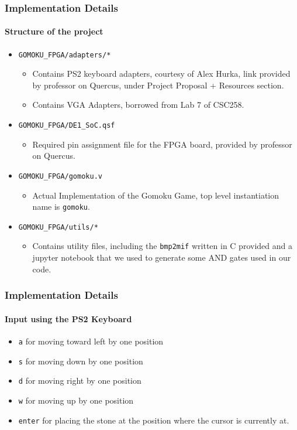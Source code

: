 \documentclass{beamer}
\begin{document}
\begin{frame}
    \frametitle{Implementation Details}
    \framesubtitle{Structure of the project}
    \begin{itemize}
        \item \texttt{GOMOKU\_FPGA/adapters/*}
        \begin{itemize}
            \item Contains PS2 keyboard adapters, courtesy of Alex Hurka, link provided by professor on Quercus, under Project Proposal + Resources section. 
            \item Contains VGA Adapters, borrowed from Lab 7 of CSC258.
        \end{itemize}
        \item \texttt{GOMOKU\_FPGA/DE1\_SoC.qsf}
        \begin{itemize}
            \item Required pin assignment file for the FPGA board, provided by professor on Quercus.
        \end{itemize}
        \item \texttt{GOMOKU\_FPGA/gomoku.v}
        \begin{itemize}
            \item Actual Implementation of the Gomoku Game, top level instantiation name is \texttt{gomoku}.
        \end{itemize}
        \item \texttt{GOMOKU\_FPGA/utils/*}
        \begin{itemize}
            \item Contains utility files, including the \texttt{bmp2mif} written in C provided and a jupyter notebook that we used to generate some AND gates used in our code. 
        \end{itemize}
    \end{itemize}
\end{frame}

\begin{frame}
    \frametitle{Implementation Details}
    \framesubtitle{Input using the PS2 Keyboard}
    \begin{itemize}
        \item \texttt{a} for moving toward left by one position
        \item \texttt{s} for moving down by one position
        \item \texttt{d} for moving right by one position
        \item \texttt{w} for moving up by one position
        \item \texttt{enter} for placing the stone at the position where the cursor is currently at.
        
    \end{itemize}
\end{frame}
\end{document}
